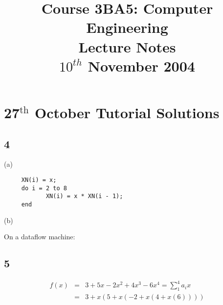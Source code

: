 \documentclass[a4paper,12pt]{article}
\begin{document}
\title{Course 3BA5: Computer Engineering \\ Lecture Notes \\ $10^{th}$ November 2004}

\maketitle

\section*{27$^{\mbox{th}}$ October Tutorial Solutions}

\subsection*{4}

(a)

\begin{verbatim}
     XN(i) = x;
     do i = 2 to 8
            XN(i) = x * XN(i - 1);
     end
\end{verbatim}

(b)

On a dataflow machine:

\begin{table}[hbtp]


\end{table}

\begin{table}[hbtp]


\end{table}

\begin{table}[hbtp]


\end{table}

\subsection*{5}

\begin{eqnarray*}
f(x)	&	=	&	3 + 5x - 2x^{2} + 4x^{3} - 6x^{4} = \sum^{4}_{1} a_{i} x	\\
		&	=	&	3 + x \left(5 + x \left(-2 + x \left(4 + x \left(6\right) \right) \right) \right)	\\ 
\end{eqnarray*}
\end{document}
